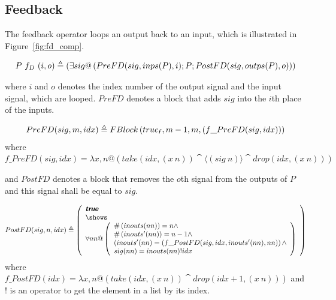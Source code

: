 \subsection{Feedback}
The feedback operator loops an output back to an input, which is illustrated in Figure~\ref{fig:fd_comp}. 
\begin{definition}[$f_D$]\label{def:fd}
    \begin{align*}
       P~f_D~(i, o) \triangleq \left(\exists sig @ \left(PreFD(sig, inps(P), i) ; P ; PostFD(sig, outps(P), o)\right) \right)
    \end{align*}
\end{definition}
where $i$ and $o$ denotes the index number of the output signal and the input signal, which are looped. $PreFD$ denotes a block that adds $sig$ into the $i$th place of the inputs.
\begin{definition}[$PreFD$]
    \begin{align*}
       PreFD(sig, m, idx) \defs FBlock\left( \logtrue{f}, m-1, m, \left(f\_PreFD(sig,idx)\right)\right)
    \end{align*}
    where $f\_PreFD(sig, idx) = \lambda x, n @ \left(take(idx, (x~n)) \cat \langle \left(sig~n\right) \rangle \cat drop (idx, (x~n))\right)$ 
    \label{def:prefd}
\end{definition}
and $PostFD$ denotes a block that removes the $o$th signal from the outputs of $P$ and this signal shall be equal to $sig$.
\begin{definition}[$PostFD$]
    \begin{align*}
       PostFD(sig, n, idx) \defs \left(
            \vdesign{\true}
                    {\forall nn @ \left(
                        \begin{array}[]{l}
                            \#\left(inouts(nn)\right) = n \land \\
                            \#\left(inouts'(nn)\right) = n-1 \land \\
                            \left(inouts'(nn) = \left(f\_PostFD(sig, idx, inouts'(nn), nn\right)\right) \land \\ 
                            sig(nn) = inouts(nn)!idx \\
                        \end{array} \right)
                    }
        \right)
    \end{align*}
    where $f\_PostFD(idx) = \lambda x, n @ \left(take(idx, (x~n)) \cat drop (idx+1, (x~n))\right)$ and $!$ is an operator to get the element in a list by its index.
\end{definition}

